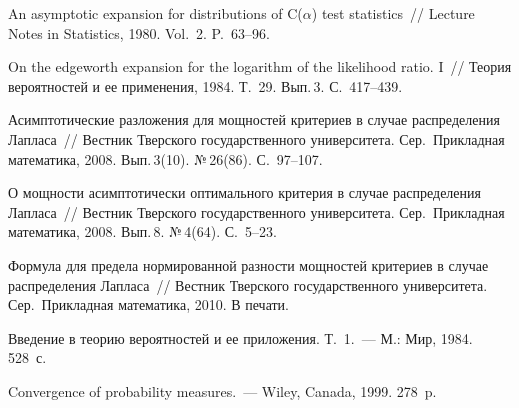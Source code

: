 \begin{multicols}{2}
{{\begin{thebibliography}{99}
An asymptotic expansion for distributions of C($\alpha$) test statistics~// Lecture Notes in Statistics, 1980. 
Vol.~2. P.~63--96.

On the edgeworth expansion for the logarithm of the likelihood
ratio. I~// Теория вероятностей и ее применения, 1984. Т.~29. Вып.\,3. С.~417--439.

Асимптотические
разложения для мощностей критериев в случае распределения Лапласа~//
Вестник Тверского государственного университета. Сер.\
Прикладная математика, 2008. Вып.\,3(10). №\,26(86). С.~97--107.

О мощности асимптотически оптимального критерия в случае
распределения Лапласа~//
Вестник Тверского государственного университета.
Сер.\ Прикладная математика, 2008. Вып.\,8. №\,4(64). С.~5--23.

Формула для предела нормированной разности мощностей критериев в случае распределения Лапласа~//
Вестник Тверского государственного университета. Сер.\
Прикладная математика, 2010. В печати.

Введение в теорию вероятностей и ее приложения. Т.~1.~---
М.: Мир, 1984. 528~с.


\label{end\stat}

 Convergence of probability measures.~--- Wiley, Canada, 1999. 278~p.



 \end{thebibliography}
}
}

\end{multicols}